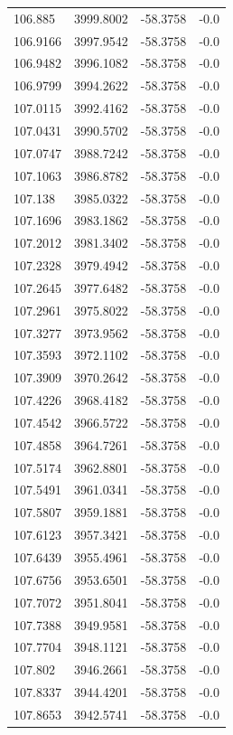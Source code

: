 \begin{table}[H]
\begin{tabular}{llll}
106.885 & 3999.8002 & -58.3758 & -0.0 \\
106.9166 & 3997.9542 & -58.3758 & -0.0 \\
106.9482 & 3996.1082 & -58.3758 & -0.0 \\
106.9799 & 3994.2622 & -58.3758 & -0.0 \\
107.0115 & 3992.4162 & -58.3758 & -0.0 \\
107.0431 & 3990.5702 & -58.3758 & -0.0 \\
107.0747 & 3988.7242 & -58.3758 & -0.0 \\
107.1063 & 3986.8782 & -58.3758 & -0.0 \\
107.138 & 3985.0322 & -58.3758 & -0.0 \\
107.1696 & 3983.1862 & -58.3758 & -0.0 \\
107.2012 & 3981.3402 & -58.3758 & -0.0 \\
107.2328 & 3979.4942 & -58.3758 & -0.0 \\
107.2645 & 3977.6482 & -58.3758 & -0.0 \\
107.2961 & 3975.8022 & -58.3758 & -0.0 \\
107.3277 & 3973.9562 & -58.3758 & -0.0 \\
107.3593 & 3972.1102 & -58.3758 & -0.0 \\
107.3909 & 3970.2642 & -58.3758 & -0.0 \\
107.4226 & 3968.4182 & -58.3758 & -0.0 \\
107.4542 & 3966.5722 & -58.3758 & -0.0 \\
107.4858 & 3964.7261 & -58.3758 & -0.0 \\
107.5174 & 3962.8801 & -58.3758 & -0.0 \\
107.5491 & 3961.0341 & -58.3758 & -0.0 \\
107.5807 & 3959.1881 & -58.3758 & -0.0 \\
107.6123 & 3957.3421 & -58.3758 & -0.0 \\
107.6439 & 3955.4961 & -58.3758 & -0.0 \\
107.6756 & 3953.6501 & -58.3758 & -0.0 \\
107.7072 & 3951.8041 & -58.3758 & -0.0 \\
107.7388 & 3949.9581 & -58.3758 & -0.0 \\
107.7704 & 3948.1121 & -58.3758 & -0.0 \\
107.802 & 3946.2661 & -58.3758 & -0.0 \\
107.8337 & 3944.4201 & -58.3758 & -0.0 \\
107.8653 & 3942.5741 & -58.3758 & -0.0 \\

\end{tabular}
\end{table}
